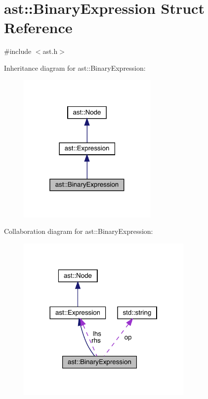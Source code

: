 \hypertarget{structast_1_1_binary_expression}{}\section{ast\+:\+:Binary\+Expression Struct Reference}
\label{structast_1_1_binary_expression}


{\ttfamily \#include $<$ast.\+h$>$}



Inheritance diagram for ast\+:\+:Binary\+Expression\+:
\nopagebreak
\begin{figure}[H]
\begin{center}
\leavevmode
\includegraphics[width=193pt]{structast_1_1_binary_expression__inherit__graph}
\end{center}
\end{figure}


Collaboration diagram for ast\+:\+:Binary\+Expression\+:
\nopagebreak
\begin{figure}[H]
\begin{center}
\leavevmode
\includegraphics[width=242pt]{structast_1_1_binary_expression__coll__graph}
\end{center}
\end{figure}

